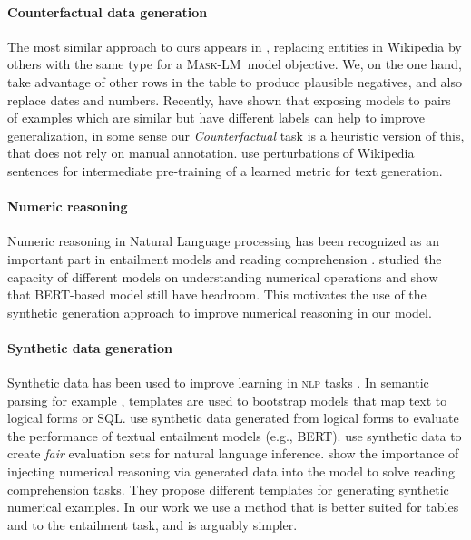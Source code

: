\documentclass[11pt,a4paper]{article}
\newcommand{\abr}[1]{\textsc{#1}}
\newcommand{\bert}{\textsc{BERT}\xspace}
\newcommand{\masklm}{\textsc{Mask-LM}\xspace}
\theoremstyle{definition}
\begin{document}
\paragraph{Counterfactual data generation}
The most similar approach to ours appears in \citet{Xiong2020Pretrained}, replacing entities in Wikipedia by others with the same type for a \masklm~model objective. We, on the one hand, take advantage of other rows in the table to produce plausible negatives, and also replace dates and numbers.
Recently, \citet{Kaushik2020Learning,gardner-2020} have shown that exposing models to pairs of examples which are similar but have different labels can help to improve generalization, in some sense our \emph{Counterfactual} task is a heuristic version of this, that does not rely on manual annotation. \citet{sellam-2020-BLEURT} use perturbations of Wikipedia sentences for intermediate pre-training of a learned metric for text generation.

\paragraph{Numeric reasoning}
Numeric reasoning in Natural Language processing has been recognized as an
important part in entailment models \cite{sammons2010ask} and reading comprehension \cite{ran2019numnet}.
\citet{wallace-etal-2019-nlp} studied the capacity of different models on understanding numerical operations and show that \bert{}-based model still have headroom. This motivates the use of the synthetic generation approach to improve numerical reasoning in our model. 

\paragraph{Synthetic data generation} Synthetic data has been used to improve learning in \abr{nlp} tasks \cite{alberti-etal-2019-synthetic,lewis-etal-2019-unsupervised,wu-etal-2016-bilingually, leonandya-etal-2019-fast}. In semantic parsing for example \cite{wang-etal-2015-building, iyer-17, dbpal}, templates are used to bootstrap models that map text to logical forms or SQL.
\citet{salvatore-etal-2019-logical} use synthetic data generated from logical forms to evaluate the performance of textual entailment models (e.g., \bert{}).
\citet{geiger-2019-posing} use synthetic data to create \emph{fair} evaluation sets for natural language inference.
\citet{Geva2020InjectingNR} show the importance of injecting numerical reasoning via generated data into the model to solve reading comprehension tasks. They propose different templates for generating synthetic numerical examples. In our work we use a method that is better suited for tables and to the entailment task, and is arguably simpler.
\end{document}
